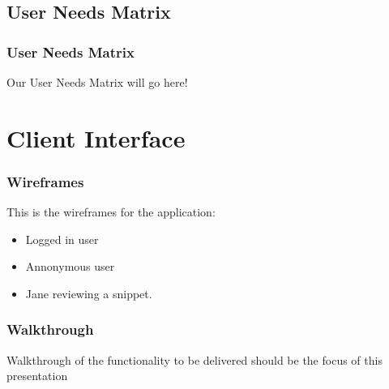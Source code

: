 \documentclass{beamer}
\begin{document}
\subsection{User Needs Matrix}

\begin{frame}
\frametitle{User Needs Matrix}
Our User Needs Matrix will go here!
\end{frame}

\section{Client Interface}

\begin{frame}
\frametitle{Wireframes}
This is the wireframes for the application:
\begin{itemize}
\item Logged in user
\item Annonymous user
\item Jane reviewing a snippet.
\end{itemize}
\end{frame}

\begin{frame}
\frametitle{Walkthrough}
Walkthrough of the functionality to be delivered should be the focus of
this presentation
\end{frame}
\end{document}
